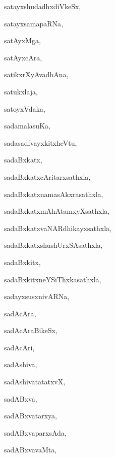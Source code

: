 \begin{multicols}{3}
{\noindent
{satayxshudadhxdiVkeSx}, \pageref{satayxshudadhxdiVkeSx}

\noindent
{satayxsamapaRNa}, \pageref{satayxsamapaRNa}

\noindent
{satAyxMga}, \pageref{satAyxMga}

\noindent
{satAyxcAra}, \pageref{satAyxcAra}

\noindent
{satikxrXyAvadhAna}, \pageref{satikxrXyAvadhAna}

\noindent
{satukxlaja}, \pageref{satukxlaja}

\noindent
{satoyxVdaka}, \pageref{satoyxVdaka}

\noindent
{sadamalasuKa}, \pageref{sadamalasuKa}

\noindent
{sadasadfvayxkitxheVtu}, \pageref{sadasadfvayxkitxheVtu}

\noindent
{sadaBxkatx}, \pageref{sadaBxkatx}

\noindent
{sadaBxkatxcAritarxsathxla}, \pageref{sadaBxkatxcAritarxsathxla}

\noindent
{sadaBxkatxnamasAkxrasathxla}, \pageref{sadaBxkatxnamasAkxrasathxla}

\noindent
{sadaBxkatxmAhAtamxyXsathxla}, \pageref{sadaBxkatxmAhAtamxyXsathxla}

\noindent
{sadaBxkatxvaNARdhikayxsathxla}, \pageref{sadaBxkatxvaNARdhikayxsathxla}

\noindent
{sadaBxkatxshushUrxSAsathxla}, \pageref{sadaBxkatxshushUrxSAsathxla}

\noindent
{sadaBxkitx}, \pageref{sadaBxkitx}

\noindent
{sadaBxkitxneYSiThxkasathxla}, \pageref{sadaBxkitxneYSiThxkasathxla}

\noindent
{sadayxsusxnivARNa}, \pageref{sadayxsusxnivARNa}

\noindent
{sadAcAra}, \pageref{sadAcAra}

\noindent
{sadAcAraBikeSx}, \pageref{sadAcAraBikeSx}

\noindent
{sadAcAri}, \pageref{sadAcAri}

\noindent
{sadAshiva}, \pageref{sadAshiva}

\noindent
{sadAshivatatatxvX}, \pageref{sadAshivatatatxvX}

\noindent
{sadABxva}, \pageref{sadABxva}

\noindent
{sadABxvatarxya}, \pageref{sadABxvatarxya}

\noindent
{sadABxvaparxsAda}, \pageref{sadABxvaparxsAda}

\noindent
{sadABxvavaMta}, \pageref{sadABxvavaMta}

}
\end{multicols}
